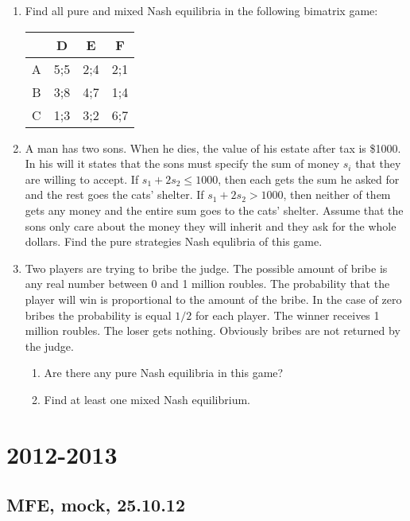 \documentclass[pdftex,12pt,a4paper]{article}
\begin{document}
\begin{enumerate}[resume]
\item Find all pure and mixed Nash equilibria in the following bimatrix game:


\begin{tabular}{c|ccc}
 & D & E & F \\ 
\hline 
A & 5;5 & 2;4 & 2;1  \\ 
B & 3;8 & 4;7 & 1;4  \\ 
C & 1;3 & 3;2 & 6;7  \\ 
\end{tabular} 
\item A man has two sons. When he dies, the value of his estate after tax is \$1000. In his will it states that the sons must specify the sum of money $s_i$ that they are willing to accept. If $s_1+2s_2\leq 1000$, then each gets the sum he asked for and the rest goes the cats’ shelter. If $s_1+2s_2> 1000$, then neither of them gets any money and the entire sum goes to the cats’ shelter. Assume that the sons only care about the money they will inherit and they ask for the whole dollars. Find the pure strategies Nash equlibria of this game.

\item Two players are trying to bribe the judge. The possible amount of bribe is any real number between 0 and 1 million roubles. The probability that the player will win is proportional to the amount of the bribe. In the case of zero bribes the probability is equal $1/2$ for each player. The winner receives 1 million roubles. The loser gets nothing. Obviously bribes are not returned by the judge. 
\begin{enumerate}
\item Are there any pure Nash equilibria in this game?
\item Find at least one mixed Nash equilibrium.
\end{enumerate}

\end{enumerate}




\section{2012-2013}

\subsection{MFE, mock, 25.10.12}
\end{document}

